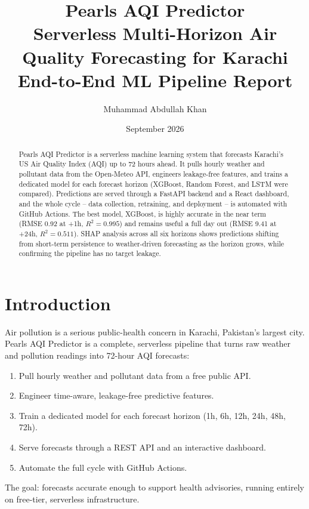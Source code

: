 \documentclass[12pt, a4paper]{article}
\title{
  \textbf{Pearls AQI Predictor} \\[0.3em]
  \large Serverless Multi-Horizon Air Quality Forecasting for Karachi \\[0.5em]
  \normalsize End-to-End ML Pipeline Report
}
\author{Muhammad Abdullah Khan}
\date{September 2026}
\begin{document}
\maketitle
\thispagestyle{empty}

\begin{abstract}
Pearls AQI Predictor is a serverless machine learning system that forecasts Karachi's US Air Quality Index (AQI) up to 72 hours ahead. It pulls hourly weather and pollutant data from the Open-Meteo API, engineers leakage-free features, and trains a dedicated model for each forecast horizon (XGBoost, Random Forest, and LSTM were compared). Predictions are served through a FastAPI backend and a React dashboard, and the whole cycle -- data collection, retraining, and deployment -- is automated with GitHub Actions. The best model, XGBoost, is highly accurate in the near term (RMSE 0.92 at +1h, $R^2 = 0.995$) and remains useful a full day out (RMSE 9.41 at +24h, $R^2 = 0.511$). SHAP analysis across all six horizons shows predictions shifting from short-term persistence to weather-driven forecasting as the horizon grows, while confirming the pipeline has no target leakage.
\end{abstract}

\tableofcontents
\newpage

\section{Introduction}

Air pollution is a serious public-health concern in Karachi, Pakistan's largest city. Pearls AQI Predictor is a complete, serverless pipeline that turns raw weather and pollution readings into 72-hour AQI forecasts:

\begin{enumerate}
  \item Pull hourly weather and pollutant data from a free public API.
  \item Engineer time-aware, leakage-free predictive features.
  \item Train a dedicated model for each forecast horizon (1h, 6h, 12h, 24h, 48h, 72h).
  \item Serve forecasts through a REST API and an interactive dashboard.
  \item Automate the full cycle with GitHub Actions.
\end{enumerate}

The goal: forecasts accurate enough to support health advisories, running entirely on free-tier, serverless infrastructure.
\end{document}

